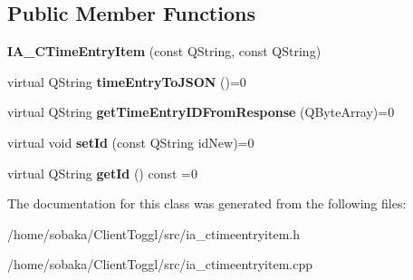 \subsection*{Public Member Functions}
\begin{DoxyCompactItemize}
\item 
\mbox{\label{classIA__CTimeEntryItem_afb08e718d45d13064ea05eded907f5a6}} 
{\bfseries I\+A\+\_\+\+C\+Time\+Entry\+Item} (const Q\+String, const Q\+String)
\item 
\mbox{\label{classIA__CTimeEntryItem_a913bc25e679f69210dccdbcb323a750e}} 
virtual Q\+String {\bfseries time\+Entry\+To\+J\+S\+ON} ()=0
\item 
\mbox{\label{classIA__CTimeEntryItem_a7f21d77723d9b184db19dcb08eba1900}} 
virtual Q\+String {\bfseries get\+Time\+Entry\+I\+D\+From\+Response} (Q\+Byte\+Array)=0
\item 
\mbox{\label{classIA__CTimeEntryItem_a21b1857db03f7679d6eec418aad07350}} 
virtual void {\bfseries set\+Id} (const Q\+String id\+New)=0
\item 
\mbox{\label{classIA__CTimeEntryItem_a238c1e8de8972398de0721389ede1660}} 
virtual Q\+String {\bfseries get\+Id} () const =0
\end{DoxyCompactItemize}


The documentation for this class was generated from the following files\+:\begin{DoxyCompactItemize}
\item 
/home/sobaka/\+Client\+Toggl/src/ia\+\_\+ctimeentryitem.\+h\item 
/home/sobaka/\+Client\+Toggl/src/ia\+\_\+ctimeentryitem.\+cpp\end{DoxyCompactItemize}
